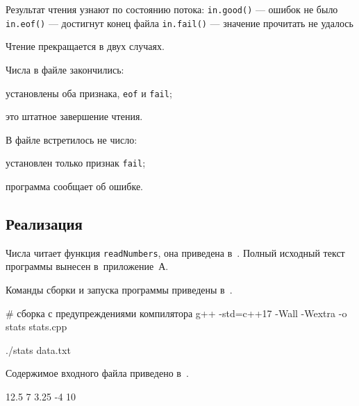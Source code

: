 \documentclass[a4paper,14pt]{extarticle}
\begin{document}
Результат чтения узнают по состоянию потока:
\suailist
\texttt{in.good()} — ошибок не было
\texttt{in.eof()} — достигнут конец файла
\texttt{in.fail()} — значение прочитать не удалось

Чтение прекращается в двух случаях.
\begin{gostenum}
  \item Числа в файле закончились:
  \begin{gostenum}
    \item установлены оба признака, \texttt{eof} и \texttt{fail};
    \item это штатное завершение чтения.
  \end{gostenum}
  \item В файле встретилось не число:
  \begin{gostenum}
    \item установлен только признак \texttt{fail};
    \item программа сообщает об ошибке.
  \end{gostenum}
\end{gostenum}

\subsection{Реализация}

Числа читает функция \texttt{readNumbers}, она приведена
в~. Полный исходный текст программы вынесен
в~приложение~А.



Команды сборки и запуска программы приведены в~.

    # сборка с предупреждениями компилятора
    g++ -std=c++17 -Wall -Wextra -o stats stats.cpp

    ./stats data.txt

Содержимое входного файла приведено в~.

    12.5 7 3.25
    -4 10
\end{document}

